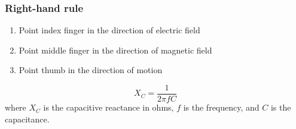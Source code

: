 \documentclass[twocolumn]{article}
\begin{document}
\subsubsection*{Right-hand rule}
\begin{enumerate}
    \item Point index finger in the direction of electric field
    \item Point middle finger in the direction of magnetic field
    \item Point thumb in the direction of motion
\end{enumerate}

\[X_C = \frac{1}{2\pi fC}\] where $X_C$ is the capacitive reactance in ohms, $f$ is the frequency, and $C$ is the capacitance.
\end{document}
